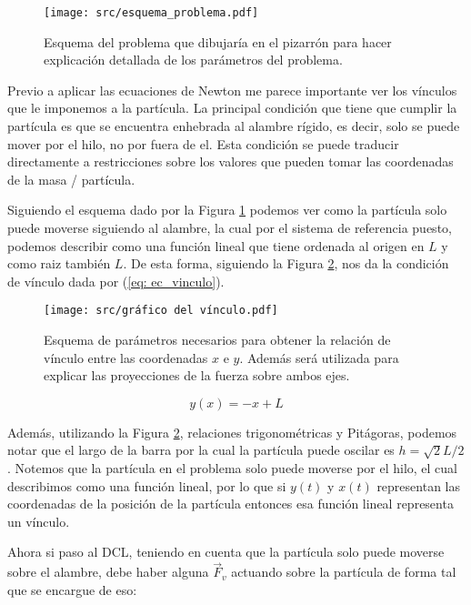 \documentclass{article}
\begin{document}
\begin{multicols}{2}
\begin{figure}[H]
    \centering
    \texttt{[image: src/esquema\_problema.pdf]}
    \caption{
        Esquema del problema que dibujaría en el pizarrón para hacer explicación detallada de los parámetros del problema.
    }
    \label{fig: diagrama_problema}
\end{figure}

Previo a aplicar las ecuaciones de Newton me parece importante ver los vínculos que le imponemos a la partícula. La principal condición que tiene que cumplir la partícula es que se encuentra enhebrada al alambre rígido, es decir, solo se puede mover por el hilo, no por fuera de el. Esta condición se puede traducir directamente a restricciones sobre los valores que pueden tomar las coordenadas de la masa / partícula.

Siguiendo el esquema dado por la Figura \ref{fig: diagrama_problema} podemos ver como la partícula solo puede moverse siguiendo al alambre, la cual por el sistema de referencia puesto, podemos describir como una función lineal que tiene ordenada al origen en $L$ y como raiz también $L$. De esta forma, siguiendo la Figura \ref{fig: vinculo}, nos da la condición de vínculo dada por (\ref{eq: ec_vinculo}).

\begin{figure}[H]
    \centering
    \texttt{[image: src/gráfico del vínculo.pdf]}
    \captionsetup{aboveskip=0pt, belowskip=0pt}
    \caption{
        Esquema de parámetros necesarios para obtener la relación de vínculo entre las coordenadas $x$ e $y$. Además será utilizada para explicar las proyecciones de la fuerza sobre ambos ejes.
    }
    \label{fig: vinculo}
\end{figure}

\begin{equation}
    y(x) = -x + L
    \label{eq: ec_vinculo}
\end{equation}

Además, utilizando la Figura \ref{fig: vinculo}, relaciones trigonométricas y Pitágoras, podemos notar que el largo de la barra por la cual la partícula puede oscilar es $h = \sqrt{2}L/2$.
Notemos que la partícula en el problema solo puede moverse por el hilo, el cual describimos como una función lineal, por lo que si $y(t)$ y $x(t)$ representan las coordenadas de la posición de la partícula entonces esa función lineal representa un vínculo.

Ahora si paso al DCL, teniendo en cuenta que la partícula solo puede moverse sobre el alambre, debe haber alguna $\vec{F}_{v}$ actuando sobre la partícula de forma tal que se encargue de eso:


\end{multicols}
\end{document}
